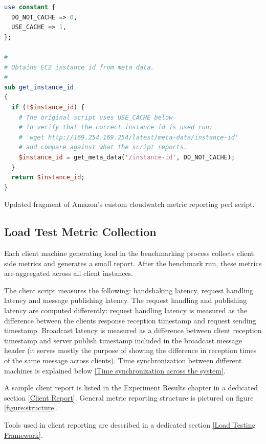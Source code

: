 \documentclass{uvamscse}
\begin{document}
\begin{sourcecode}
\begin{lstlisting}[style=mono, language=perl]
use constant {
  DO_NOT_CACHE => 0,
  USE_CACHE => 1,
};

#
# Obtains EC2 instance id from meta data.
#
sub get_instance_id
{
  if (!$instance_id) {
    # The original script uses USE_CACHE below
    # To verify that the correct instance id is used run:
    # 'wget http://169.254.169.254/latest/meta-data/instance-id'
    # and compare against what the script reports.
    $instance_id = get_meta_data('/instance-id', DO_NOT_CACHE);
  }
  return $instance_id;
}
\end{lstlisting}
\caption{Updated fragment of Amazon's custom cloudwatch metric reporting perl script.}
\label{lstlisting:perl}
\end{sourcecode}

\subsection{Load Test Metric Collection}

Each client machine generating load in the benchmarking process collects client side metrics and generates a small report. After the benchmark run, these metrics are aggregated across all client instances.

The client script measures the following: handshaking latency, request handling latency and message publishing latency. The request handling and publishing latency are computed differently: request handling latency is measured as the difference between the clients response reception timestamp and request sending timestamp. Broadcast latency is measured as a difference between client reception timestamp and server publish timestamp included in the broadcast message header (it serves mostly the purpose of showing the difference in reception times of the same message across clients). Time synchronization between different machines is explained below \ref{Time synchronization across the system}.

A sample client report is listed in the Experiment Results chapter in a dedicated section \ref{Client Report}. General metric reporting structure is pictured on figure \ref{figure:structure}.

Tools used in client reporting are described in a dedicated section \ref{Load Testing Framework}.
\end{document}
